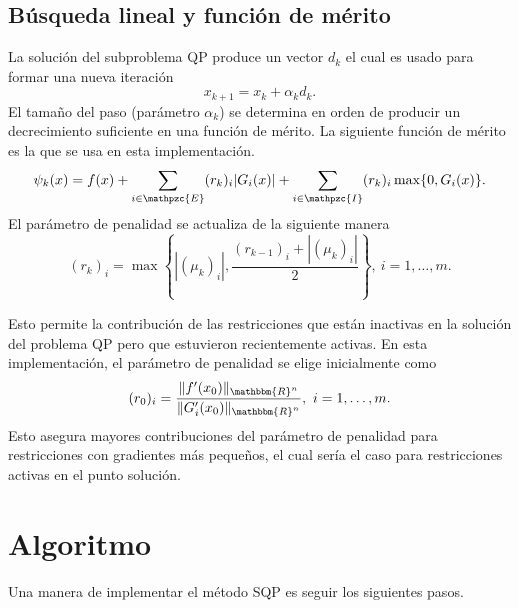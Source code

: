 \documentclass[a4paper,10pt]{book}
\newcommand{\R}{\mathbbm{R}}
\newcommand{\Rn}{\R^n}
\newcommand{\cI}{\mathpzc{I}}
\newcommand{\cE}{\mathpzc{E}}
\begin{document}
\subsection{Búsqueda lineal y función de mérito}

La solución del subproblema QP produce un vector $d_k$ el cual es usado para formar una nueva iteración $$x_{k+1}=x_k+\alpha_kd_k.$$
El tamaño del paso (parámetro $\alpha_k$) se determina en orden de producir un decrecimiento suficiente en una función de mérito. La siguiente función de mérito es la que se usa en esta implementación. $$\psi_k(x)=f(x)+\sum_{i\in\cE}(r_k)_i |G_i (x)|+\sum_{i\in\cI} (r_k)_i \max\{0,G_i(x)\}.$$
El parámetro de penalidad se actualiza de la siguiente manera
\begin{equation}\label{penalidad}
    (r_k)_i=\max\left\{|(\mu_k)_i|,\frac{(r_{k-1})_i+|(\mu_k)_i|}{2}\right\}, \ i=1,\ldots,m.
\end{equation}

Esto permite la contribución de las restricciones que están inactivas en la solución del problema QP pero que estuvieron recientemente activas. En esta implementación, el parámetro de penalidad se elige inicialmente como $$(r_0)_i=\frac{\|f'(x_0)\|_{\Rn}}{\|G'_i(x_0)\|_{\Rn}}, \ i=1,\ldots,m.$$
Esto asegura mayores contribuciones del parámetro de penalidad para restricciones con gradientes más pequeños, el cual sería el caso para restricciones activas en el punto solución.

\section{Algoritmo}



Una manera de implementar el método SQP es seguir los siguientes pasos.
 
\end{document}

